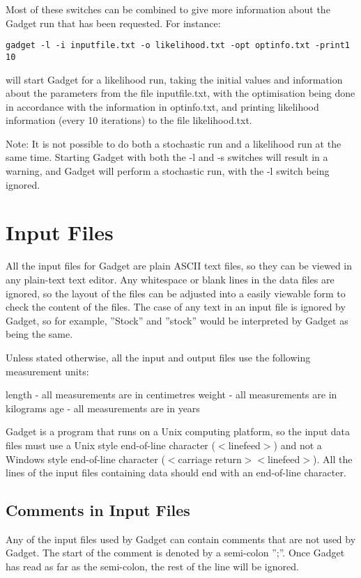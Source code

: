 \documentclass [a4paper, 10pt]{book}
\begin{document}
\bigskip
Most of these switches can be combined to give more information about the Gadget run that has been requested.  For instance:

\begin{verbatim}
gadget -l -i inputfile.txt -o likelihood.txt -opt optinfo.txt -print1 10
\end{verbatim}

will start Gadget for a likelihood run, taking the initial values and information about the parameters from the file inputfile.txt, with the optimisation being done in accordance with the information in optinfo.txt, and printing likelihood information (every 10 iterations) to the file likelihood.txt.

\bigskip
Note: It is not possible to do both a stochastic run and a likelihood run at the same time.  Starting Gadget with both the -l and -s switches will result in a warning, and Gadget will perform a stochastic run, with the -l switch being ignored.

\chapter{Input Files}\label{chap:input}
All the input files for Gadget are plain ASCII text files, so they can be viewed in any plain-text text editor.  Any whitespace or blank lines in the data files are ignored, so the layout of the files can be adjusted into a easily viewable form to check the content of the files.  The case of any text in an input file is ignored by Gadget, so for example, ''Stock'' and ''stock'' would be interpreted by Gadget as being the same.

\bigskip
Unless stated otherwise, all the input and output files use the following measurement units:\newline

length - all measurements are in centimetres\newline
weight - all measurements are in kilograms\newline
age - all measurements are in years

\bigskip
Gadget is a program that runs on a Unix computing platform, so the input data files must use a Unix style end-of-line character ($<$linefeed$>$) and not a Windows style end-of-line character ($<$carriage return$>$$<$linefeed$>$).  All the lines of the input files containing data should end with an end-of-line character.

\section{Comments in Input Files}\label{sec:comments}
Any of the input files used by Gadget can contain comments that are not used by Gadget.  The start of the comment is denoted by a semi-colon '';''.  Once Gadget has read as far as the semi-colon, the rest of the line will be ignored.
\end{document}
